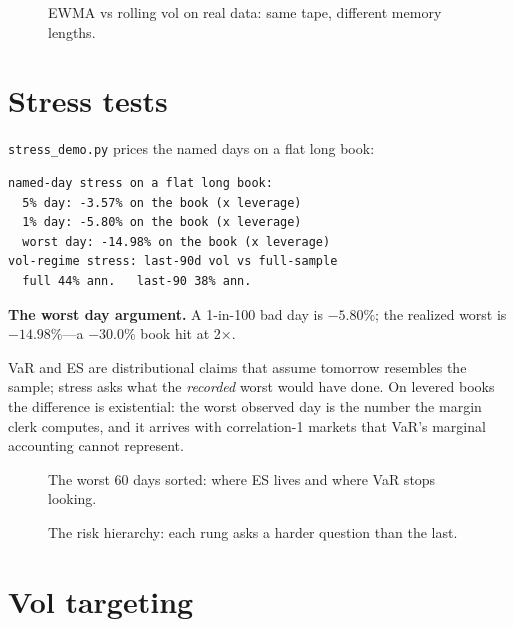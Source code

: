 \begin{figure}[htbp]\centering

\caption{EWMA vs rolling vol on real data: same tape, different memory lengths.}
\label{fig:ewma}
\end{figure}

\section{Stress tests}\label{sec:stress}

\texttt{stress\_demo.py} prices the named days on a flat long book:
\begin{lstlisting}[numbers=none]
named-day stress on a flat long book:
  5% day: -3.57% on the book (x leverage)
  1% day: -5.80% on the book (x leverage)
  worst day: -14.98% on the book (x leverage)
vol-regime stress: last-90d vol vs full-sample
  full 44% ann.   last-90 38% ann.
\end{lstlisting}

\begin{example}\label{ex:stress}
\textbf{The worst day argument.} A 1-in-100 bad day is $-5.80\%$; the realized worst is
$-14.98\%$---a $-30.0\%$ book hit at 2$\times$.
\begin{solution}
VaR and ES are distributional claims that assume tomorrow resembles the sample; stress
asks what the \emph{recorded} worst would have done. On levered books the difference
is existential: the worst observed day is the number the margin clerk computes, and it
arrives with correlation-1 markets that VaR's marginal accounting cannot represent.
\end{solution}
\end{example}

\begin{figure}[htbp]\centering

\caption{The worst 60 days sorted: where ES lives and where VaR stops looking.}
\label{fig:tail}
\end{figure}

\begin{figure}[htbp]\centering

\caption{The risk hierarchy: each rung asks a harder question than the last.}
\label{fig:levels}
\end{figure}

\section{Vol targeting}\label{sec:voltgt}

